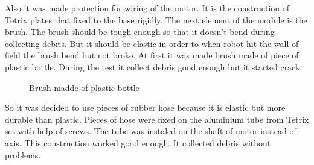	Also it was made protection for wiring of the motor. It is the construction of Tetrix plates that fixed to the base rigidly.\newline
	The next element of the module is the brush. The brush should be tough enough so that it doesn't bend during collecting debris. But it should be elastic in order to when robot hit the wall of field the brush bend but not broke.\newline
	At first it was made brush made of piece of plastic bottle. During the test it collect debris good enough but it started crack.
	\begin{figure}[H]
		\begin{minipage}[h]{1\linewidth}
			\caption{Brush madde of plastic bottle}
		\end{minipage}
	\end{figure}
	So it was decided to use pieces of rubber hose because it is elastic but more durable than plastic. Pieces of hose were fixed on the aluminium tube from Tetrix set with help of screws. The tube was instaled on the shaft of motor instead of axis. This construction worked good enough. It collected debris without problems.  
